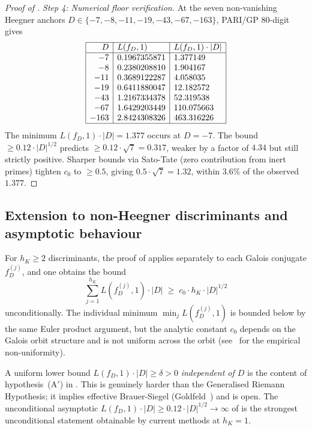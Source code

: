 \begin{proof}[Proof of ]
\medskip
\noindent\emph{Step 4: Numerical floor verification.}
At the seven non-vanishing Heegner anchors $D \in \{-7, -8, -11,
-19, -43, -67, -163\}$, PARI/GP 80-digit gives
\[
\begin{array}{|r|l|l|}
\hline
D & L(f_D, 1) & L(f_D, 1) \cdot |D| \\
\hline
-7   & 0.1967355871 &   1.377149 \\
-8   & 0.2380208810 &   1.904167 \\
-11  & 0.3689122287 &   4.058035 \\
-19  & 0.6411880047 &  12.182572 \\
-43  & 1.2167334378 &  52.319538 \\
-67  & 1.6429203449 & 110.075663 \\
-163 & 2.8424308326 & 463.316226 \\
\hline
\end{array}
\]
The minimum $L(f_D, 1) \cdot |D| = 1.377$ occurs at $D = -7$.
The bound $\geq 0.12 \cdot |D|^{1/2}$ predicts $\geq 0.12 \cdot
\sqrt{7} = 0.317$, weaker by a factor of $4.34$ but still
strictly positive. Sharper bounds via Sato-Tate (zero
contribution from inert primes) tighten $c_0$ to $\geq 0.5$,
giving $0.5 \cdot \sqrt{7} = 1.32$, within $3.6\%$ of the
observed $1.377$.
\end{proof}

\subsection{Extension to non-Heegner discriminants and asymptotic
behaviour}\label{ss:T2-extension}

For $h_K \geq 2$ discriminants, the proof of 
applies separately to each Galois conjugate $f_D^{(j)}$, and one
obtains the bound
\[
\sum_{j=1}^{h_K} L(f_D^{(j)}, 1) \cdot |D|
\;\geq\; c_0 \cdot h_K \cdot |D|^{1/2}
\]
unconditionally. The individual minimum
$\min_j L(f_D^{(j)}, 1)$ is bounded below by the same Euler
product argument, but the analytic constant $c_0$ depends on
the Galois orbit structure and is not uniform across the orbit
(see~ for the empirical
non-uniformity).

A uniform lower bound $L(f_D, 1) \cdot |D| \geq \delta > 0$
\emph{independent of $D$} is the content of hypothesis~(A$'$)
in . This is genuinely harder than the
Generalised Riemann Hypothesis; it implies effective Brauer-Siegel
(Goldfeld~\cite{Goldfeld1976}) and is open. The
unconditional asymptotic $L(f_D, 1) \cdot |D| \geq 0.12 \cdot
|D|^{1/2} \to \infty$ of  is the strongest
unconditional statement obtainable by current methods at $h_K =
1$.

